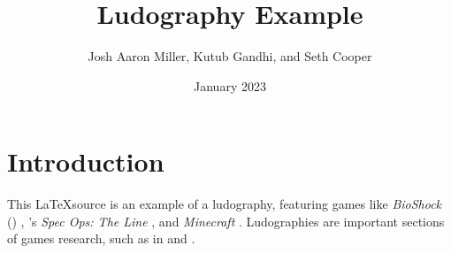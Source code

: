 \documentclass[sigconf]{acmart}
\title{Ludography Example}
\author{Josh Aaron Miller, Kutub Gandhi, and Seth Cooper}
\date{January 2023}
\newcommand{\citegameprefix}{G}
\begin{document}
\maketitle

\section{Introduction}

This \LaTeX source is an example of a ludography, featuring games like \emph{BioShock} (\citeyear{bioshock}) , \citeauthor{specops}'s  \emph{Spec Ops: The Line} , and \emph{Minecraft} . Ludographies are important sections of games research, such as in \cite{gandhi_philosophy_2022} and \cite{poretski2022press}.



\renewcommand{\bibnumfmt}[1]{[#1]}%



\renewcommand{\bibnumfmt}[1]{[\citegameprefix#1]}%

\end{document}
